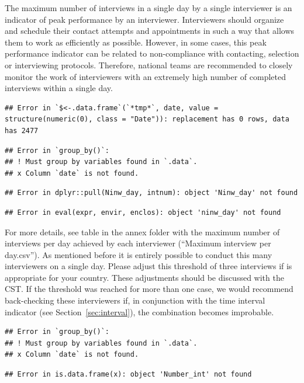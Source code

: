 \documentclass[
  11pt,
  a4paperpaper,
]{article}
\newcommand*{\secref}[1]{Section~\ref{#1}}
\begin{document}
The maximum number of interviews in a single day by a single interviewer
is an indicator of peak performance by an interviewer. Interviewers
should organize and schedule their contact attempts and appointments in
such a way that allows them to work as efficiently as possible. However,
in some cases, this peak performance indicator can be related to
non-compliance with contacting, selection or interviewing protocols.
Therefore, national teams are recommended to closely monitor the work of
interviewers with an extremely high number of completed interviews
within a single day.

\begin{verbatim}
## Error in `$<-.data.frame`(`*tmp*`, date, value = structure(numeric(0), class = "Date")): replacement has 0 rows, data has 2477
\end{verbatim}

\begin{verbatim}
## Error in `group_by()`:
## ! Must group by variables found in `.data`.
## x Column `date` is not found.
\end{verbatim}

\begin{verbatim}
## Error in dplyr::pull(Ninw_day, intnum): object 'Ninw_day' not found
\end{verbatim}

\begin{verbatim}
## Error in eval(expr, envir, enclos): object 'ninw_day' not found
\end{verbatim}

For more details, see table in the annex folder with the maximum number
of interviews per day achieved by each interviewer (``Maximum interview
per day.csv''). As mentioned before it is entirely possible to conduct
this many interviewers on a single day. Please adjust this threshold of
three interviews if is appropriate for your country. These adjustments
should be discussed with the CST. If the threshold was reached for more
than one case, we would recommend back-checking these interviewers if,
in conjunction with the time interval indicator (see
\secref{sec:interval}), the combination becomes improbable.

\begin{verbatim}
## Error in `group_by()`:
## ! Must group by variables found in `.data`.
## x Column `date` is not found.
\end{verbatim}

\begin{verbatim}
## Error in is.data.frame(x): object 'Number_int' not found
\end{verbatim}
\end{document}
